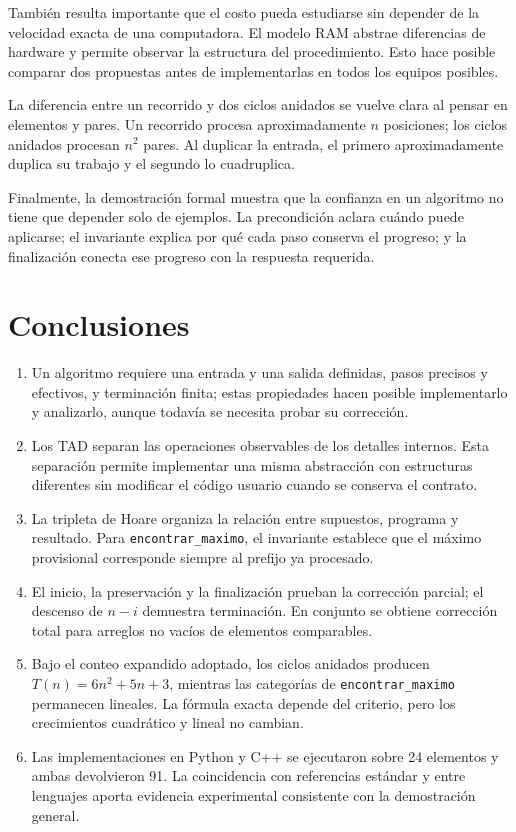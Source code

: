 \documentclass[12pt,letterpaper]{article}
\newcommand{\codigo}[1]{\texttt{#1}}
\begin{document}
También resulta importante que el costo pueda estudiarse sin depender de la velocidad exacta de una computadora. El modelo RAM abstrae diferencias de hardware y permite observar la estructura del procedimiento. Esto hace posible comparar dos propuestas antes de implementarlas en todos los equipos posibles.

La diferencia entre un recorrido y dos ciclos anidados se vuelve clara al pensar en elementos y pares. Un recorrido procesa aproximadamente $n$ posiciones; los ciclos anidados procesan $n^2$ pares. Al duplicar la entrada, el primero aproximadamente duplica su trabajo y el segundo lo cuadruplica.

Finalmente, la demostración formal muestra que la confianza en un algoritmo no tiene que depender solo de ejemplos. La precondición aclara cuándo puede aplicarse; el invariante explica por qué cada paso conserva el progreso; y la finalización conecta ese progreso con la respuesta requerida.

\section{Conclusiones}

\begin{enumerate}
  \item Un algoritmo requiere una entrada y una salida definidas, pasos precisos y efectivos, y terminación finita; estas propiedades hacen posible implementarlo y analizarlo, aunque todavía se necesita probar su corrección.
  \item Los TAD separan las operaciones observables de los detalles internos. Esta separación permite implementar una misma abstracción con estructuras diferentes sin modificar el código usuario cuando se conserva el contrato.
  \item La tripleta de Hoare organiza la relación entre supuestos, programa y resultado. Para \codigo{encontrar\_maximo}, el invariante establece que el máximo provisional corresponde siempre al prefijo ya procesado.
  \item El inicio, la preservación y la finalización prueban la corrección parcial; el descenso de $n-i$ demuestra terminación. En conjunto se obtiene corrección total para arreglos no vacíos de elementos comparables.
  \item Bajo el conteo expandido adoptado, los ciclos anidados producen $T(n)=6n^2+5n+3$, mientras las categorías de \codigo{encontrar\_maximo} permanecen lineales. La fórmula exacta depende del criterio, pero los crecimientos cuadrático y lineal no cambian.
  \item Las implementaciones en Python y C++ se ejecutaron sobre 24 elementos y ambas devolvieron 91. La coincidencia con referencias estándar y entre lenguajes aporta evidencia experimental consistente con la demostración general.
\end{enumerate}
\end{document}
